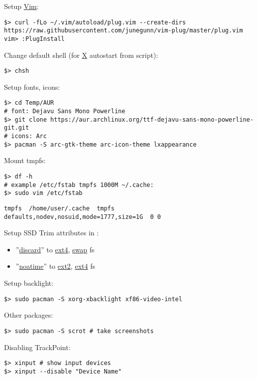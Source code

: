\documentclass[a4paper, 12pt]{article}
\begin{document}
Setup \url{Vim}:
\begin{lstlisting}
$> curl -fLo ~/.vim/autoload/plug.vim --create-dirs  https://raw.githubusercontent.com/junegunn/vim-plug/master/plug.vim
vim> :PlugInstall
\end{lstlisting}

Change default shell (for \url{X} autostart from  script):
\begin{lstlisting}
$> chsh
\end{lstlisting}

Setup fonts, icons:
\begin{lstlisting}
$> cd Temp/AUR
# font: Dejavu Sans Mono Powerline
$> git clone https://aur.archlinux.org/ttf-dejavu-sans-mono-powerline-git.git
# icons: Arc
$> pacman -S arc-gtk-theme arc-icon-theme lxappearance
\end{lstlisting}

Mount tmpfs:
\begin{lstlisting}
$> df -h
# example /etc/fstab tmpfs 1000M ~/.cache:
$> sudo vim /etc/fstab
\end{lstlisting}

\begin{lstlisting}[style=style_file,caption={/etc/fstab add line:}]
tmpfs  /home/user/.cache  tmpfs  defaults,nodev,nosuid,mode=1777,size=1G  0 0
\end{lstlisting}

Setup SSD Trim attributes in :
\begin{itemize}
\item ''\url{discard}'' to \url{ext4}, \url{swap} fs
\item ''\url{noatime}'' to \url{ext2}, \url{ext4} fs
\end{itemize}

Setup backlight:
\begin{lstlisting}
$> sudo pacman -S xorg-xbacklight xf86-video-intel
\end{lstlisting}

Other packages:
\begin{lstlisting}
$> sudo pacman -S scrot # take screenshots
\end{lstlisting}

Disabling TrackPoint:
\begin{lstlisting}
$> xinput # show input devices
$> xinput --disable "Device Name"
\end{lstlisting}
\end{document}
